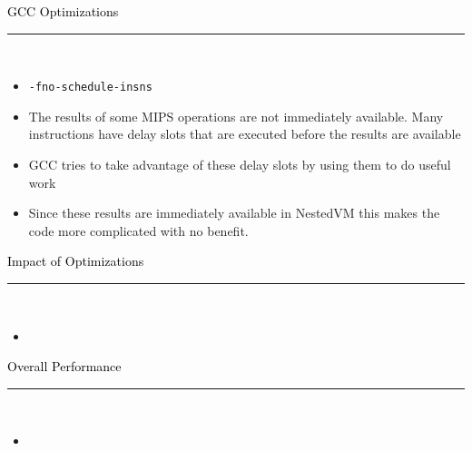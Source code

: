 \documentclass[letter]{seminar}
\begin{document}
\begin{slide}\raggedright
\renewcommand{\leftmargini}{5mm}
{\Large{\textcolor{black}{GCC Optimizations}}}
\\\rule{\textwidth}{0.1pt}\\

\begin{itemize}


\item
     {\texttt{-fno-schedule-insns}}

\item
     The results of some MIPS operations are not immediately available. Many 
      instructions have delay slots that are executed before the results are 
      available

\item
     GCC tries to take advantage of these delay slots by using them to do useful 
      work

\item
     Since these results are immediately available in NestedVM this makes the 
      code more complicated with no benefit.


\end{itemize}


\end{slide}


\begin{slide}\raggedright
\renewcommand{\leftmargini}{5mm}
{\Large{\textcolor{black}{Impact of Optimizations}}}
\\\rule{\textwidth}{0.1pt}\\

\begin{itemize}

\item \begin{figure}[H]
\begin{center}
\end{center}
\end{figure}

\end{itemize}


\end{slide}


\begin{slide}\raggedright
\renewcommand{\leftmargini}{5mm}
{\Large{\textcolor{black}{Overall Performance}}}
\\\rule{\textwidth}{0.1pt}\\

\begin{itemize}

\item \begin{figure}[H]
\begin{center}
\end{center}
\end{figure}

\end{itemize}


\end{slide}
\end{document}
